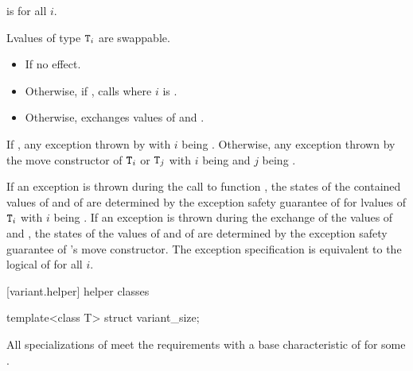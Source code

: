 \begin{itemdescr}
\pnum
\mandates
{} is  for all $i$.

\pnum
\expects
Lvalues of type $\texttt{T}_i$ are swappable.

\pnum
\effects
\begin{itemize}
\item
If  no effect.
\item
Otherwise, if , calls  where $i$ is .
\item
Otherwise, exchanges values of  and .
\end{itemize}

\pnum
\throws
If ,
any exception thrown by 
with $i$ being .
Otherwise, any exception thrown by the move constructor
of $\texttt{T}_i$ or $\texttt{T}_j$
with $i$ being  and $j$ being .

\pnum
\remarks
If an exception is thrown during the call to function ,
the states of the contained values of  and of  are
determined by the exception safety guarantee of  for lvalues of
$\texttt{T}_i$ with $i$ being .
If an exception is thrown during the exchange of the values of 
and , the states of the values of  and of 
are determined by the exception safety guarantee of 's move constructor.
The exception specification is equivalent to the logical  of
 for all $i$.
\end{itemdescr}

[variant.helper]{ helper classes}

%
\begin{itemdecl}
template<class T> struct variant_size;
\end{itemdecl}

\begin{itemdescr}
\pnum
All specializations of  meet the
 requirements
with a base characteristic of  for some .
\end{itemdescr}

